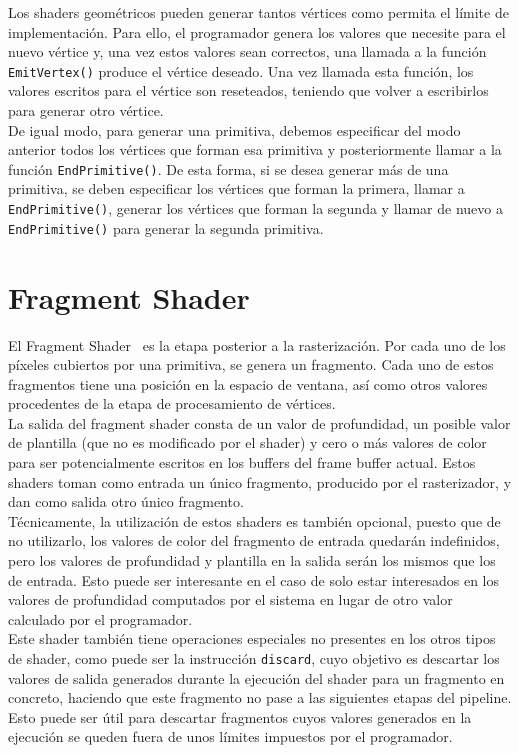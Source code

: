 Los shaders geométricos pueden generar tantos vértices como permita el límite de
implementación. Para ello, el programador genera los valores que necesite para
el nuevo vértice y, una vez estos valores sean correctos, una llamada a la
función \verb|EmitVertex()| produce el vértice deseado. Una vez llamada esta
función, los valores escritos para el vértice son reseteados, teniendo que
volver a escribirlos para generar otro vértice. \\

De igual modo, para generar una primitiva, debemos especificar del modo anterior
todos los vértices que forman esa primitiva y posteriormente llamar a la función
\verb|EndPrimitive()|. De esta forma, si se desea generar más de una primitiva,
se deben especificar los vértices que forman la primera, llamar a
\verb|EndPrimitive()|, generar los vértices que forman la segunda y llamar de
nuevo a \verb|EndPrimitive()| para generar la segunda primitiva.

\section{Fragment Shader}
\label{ref:FragShader}

El Fragment Shader~\cite{FragShader} es la etapa posterior a la rasterización.
Por cada uno de los píxeles cubiertos por una primitiva, se genera un fragmento.
Cada uno de estos fragmentos tiene una posición en la espacio de ventana, así
como otros valores procedentes de la etapa de procesamiento de vértices. \\ 

La salida del fragment shader consta de un valor de profundidad, un posible
valor de plantilla (que no es modificado por el shader) y cero o más valores de
color para ser potencialmente escritos en los buffers del frame buffer actual.
Estos shaders toman como entrada un único fragmento, producido por el
rasterizador, y dan como salida otro único fragmento. \\

Técnicamente, la utilización de estos shaders es también opcional, puesto que de
no utilizarlo, los valores de color del fragmento de entrada quedarán
indefinidos, pero los valores de profundidad y plantilla en la salida serán los
mismos que los de entrada. Esto puede ser interesante en el caso de solo estar
interesados en los valores de profundidad computados por el sistema en lugar de
otro valor calculado por el programador. \\

Este shader también tiene operaciones especiales no presentes en los otros tipos
de shader, como puede ser la instrucción \verb|discard|, cuyo objetivo es
descartar los valores de salida generados durante la ejecución del shader para
un fragmento en concreto, haciendo que este fragmento no pase a las siguientes
etapas del pipeline. Esto puede ser útil para descartar fragmentos cuyos valores
generados en la ejecución se queden fuera de unos límites impuestos por el
programador.
